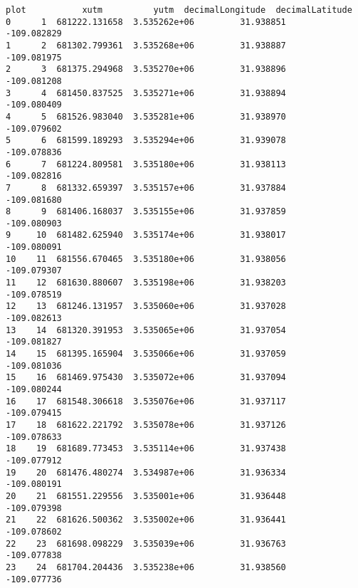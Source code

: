 \documentclass[11pt]{article}
\makeatletter
\newcommand{\boxspacing}{\kern\kvtcb@left@rule\kern\kvtcb@boxsep}
\newcommand{\prompt}[4]{
        {\ttfamily\llap{{\color{#2}[#3]:\hspace{3pt}#4}}\vspace{-\baselineskip}}
    }
\makeatother
\begin{document}
            \begin{tcolorbox}[breakable, size=fbox, boxrule=.5pt, pad at break*=1mm, opacityfill=0]
\prompt{Out}{outcolor}{23}{\boxspacing}
\begin{Verbatim}[commandchars=\\\{\}]
    plot           xutm          yutm  decimalLongitude  decimalLatitude
0      1  681222.131658  3.535262e+06         31.938851      -109.082829
1      2  681302.799361  3.535268e+06         31.938887      -109.081975
2      3  681375.294968  3.535270e+06         31.938896      -109.081208
3      4  681450.837525  3.535271e+06         31.938894      -109.080409
4      5  681526.983040  3.535281e+06         31.938970      -109.079602
5      6  681599.189293  3.535294e+06         31.939078      -109.078836
6      7  681224.809581  3.535180e+06         31.938113      -109.082816
7      8  681332.659397  3.535157e+06         31.937884      -109.081680
8      9  681406.168037  3.535155e+06         31.937859      -109.080903
9     10  681482.625940  3.535174e+06         31.938017      -109.080091
10    11  681556.670465  3.535180e+06         31.938056      -109.079307
11    12  681630.880607  3.535198e+06         31.938203      -109.078519
12    13  681246.131957  3.535060e+06         31.937028      -109.082613
13    14  681320.391953  3.535065e+06         31.937054      -109.081827
14    15  681395.165904  3.535066e+06         31.937059      -109.081036
15    16  681469.975430  3.535072e+06         31.937094      -109.080244
16    17  681548.306618  3.535076e+06         31.937117      -109.079415
17    18  681622.221792  3.535078e+06         31.937126      -109.078633
18    19  681689.773453  3.535114e+06         31.937438      -109.077912
19    20  681476.480274  3.534987e+06         31.936334      -109.080191
20    21  681551.229556  3.535001e+06         31.936448      -109.079398
21    22  681626.500362  3.535002e+06         31.936441      -109.078602
22    23  681698.098229  3.535039e+06         31.936763      -109.077838
23    24  681704.204436  3.535238e+06         31.938560      -109.077736
\end{Verbatim}
\end{tcolorbox}
        
\end{document}
